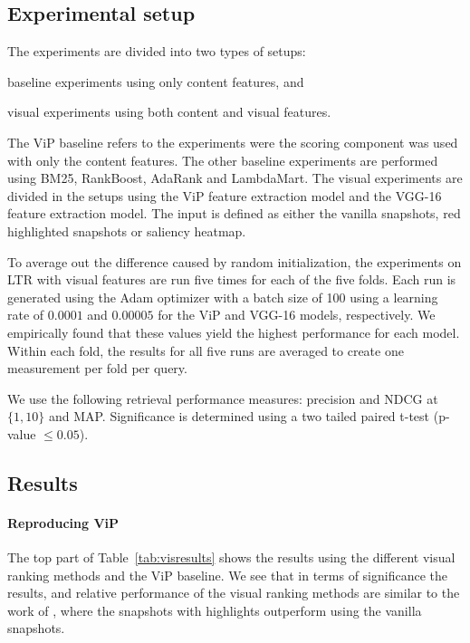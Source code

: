 \subsection{Experimental setup}
The experiments are divided into two types of setups:
\begin{inparaenum}[(i)]
\item baseline experiments using only content features, and
\item visual experiments using both content and visual features.
\end{inparaenum}

The ViP baseline refers to the experiments were the scoring component was used with only the content features. The other baseline experiments are performed using BM25, RankBoost, AdaRank and LambdaMart. 
The visual experiments are divided in the setups using the ViP feature extraction model and the VGG-16 feature extraction model. The input is defined as either the vanilla snapshots, red highlighted snapshots or saliency heatmap. 

To average out the difference caused by random initialization, the experiments on \ac{LTR} with visual features are run five times for each of the five folds. 
Each run is generated using the Adam optimizer with a batch size of 100 using a learning rate of $0.0001$ and $0.00005$ for the ViP and VGG-16 models, respectively. We empirically found that these values yield the highest performance for each model.
Within each fold, the results for all five runs are averaged to create one measurement per fold per query.

We use the following retrieval performance measures: precision and NDCG at $\{1,10\}$ and MAP.
Significance is determined using a two tailed paired t-test (p-value $\leq 0.05$). 

\subsection{Results}

\paragraph{Reproducing ViP}
The top part of Table~\ref{tab:visresults} shows the results using the different visual ranking methods and the ViP baseline. 
We see that in terms of significance the results, and relative performance of the visual ranking methods are similar to the work of \citet{fan2017learning}, where the snapshots with highlights outperform using the vanilla snapshots.

